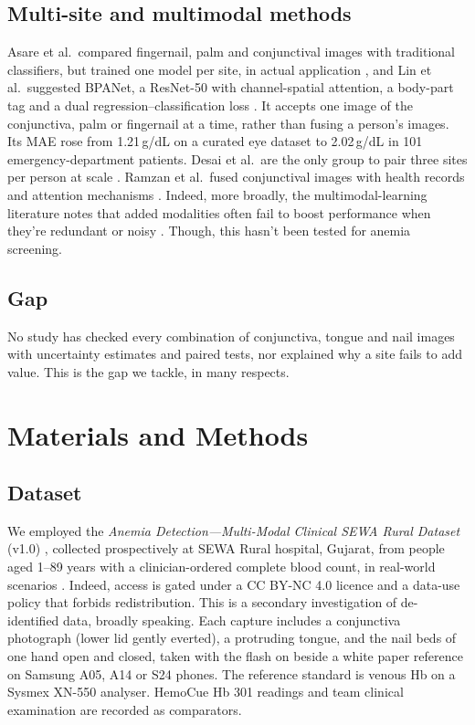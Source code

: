 \documentclass[10pt,a4paper,twocolumn]{article}
\newcommand{\gdl}{\,g/dL}
\begin{document}
\subsection{Multi-site and multimodal methods}
Asare et al.\ compared fingernail, palm and conjunctival images with traditional classifiers, but trained one model per site, in actual application \cite{asare2023}, and Lin et al.\ suggested BPANet, a ResNet-50 \cite{he2016} with channel-spatial attention, a body-part tag and a dual regression--classification loss \cite{lin2025}. It accepts one image of the conjunctiva, palm or fingernail at a time, rather than fusing a person's images. Its MAE rose from 1.21\gdl{} on a curated eye dataset to 2.02\gdl{} in 101 emergency-department patients. Desai et al.\ are the only group to pair three sites per person at scale \cite{desai2026}. Ramzan et al.\ fused conjunctival images with health records and attention mechanisms \cite{ramzan2024a,ramzan2024b}. Indeed, more broadly, the multimodal-learning literature notes that added modalities often fail to boost performance when they're redundant or noisy \cite{baltrusaitis2019}. Though, this hasn't been tested for anemia screening.

\subsection{Gap}
No study has checked every combination of conjunctiva, tongue and nail images with uncertainty estimates and paired tests, nor explained why a site fails to add value. This is the gap we tackle, in many respects.

\section{Materials and Methods}

\subsection{Dataset}
We employed the \emph{Anemia Detection---Multi-Modal Clinical SEWA Rural Dataset} (v1.0) \cite{sewa2026}, collected prospectively at SEWA Rural hospital, Gujarat, from people aged 1--89 years with a clinician-ordered complete blood count, in real-world scenarios \cite{desai2026}. Indeed, access is gated under a CC BY-NC 4.0 licence and a data-use policy that forbids redistribution. This is a secondary investigation of de-identified data, broadly speaking. Each capture includes a conjunctiva photograph (lower lid gently everted), a protruding tongue, and the nail beds of one hand open and closed, taken with the flash on beside a white paper reference on Samsung A05, A14 or S24 phones. The reference standard is venous Hb on a Sysmex XN-550 analyser. HemoCue Hb 301 readings and team clinical examination are recorded as comparators.
\end{document}
